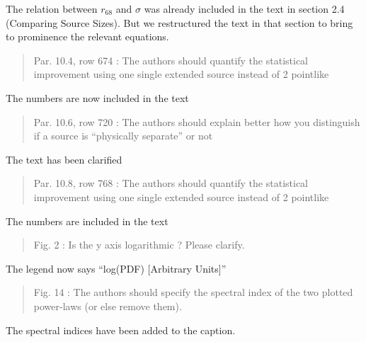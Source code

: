 \documentclass{article}
\newenvironment{referee}
{\begin{quote}\color{red}}
  {\end{quote}}
\newenvironment{reply}
  {}
  {}
\begin{document}
\begin{reply}
  The relation between $r_{68}$ and $\sigma$ was already included in the text
in section 2.4 (Comparing Source Sizes). But we restructured the
text in that section to bring to prominence the relevant equations.
\end{reply}

\begin{referee}
Par. 10.4, row 674 : The authors should quantify the statistical
improvement using one single extended source instead of 2 pointlike
\end{referee}

\begin{reply}
The numbers are now included in the text
\end{reply}

\begin{referee}
Par. 10.6, row 720 : The authors should explain better how you distinguish
if a source is ``physically separate'' or not
\end{referee}

\begin{reply}
The text has been clarified
\end{reply}

\begin{referee}
Par. 10.8, row 768 : The authors should quantify the statistical
improvement using one single extended source instead of 2 pointlike
\end{referee}

\begin{reply}
The numbers are included in the text
\end{reply}

\begin{referee}
Fig. 2 : Is the y axis logarithmic ? Please clarify.
\end{referee}

\begin{reply}
The legend now says ``log(PDF) [Arbitrary Units]''
\end{reply}

\begin{referee}
Fig. 14 : The authors should specify the spectral index of the two plotted power-laws (or else remove them).
\end{referee}

\begin{reply}
The spectral indices have been added to the caption.
\end{reply}
\end{document}
